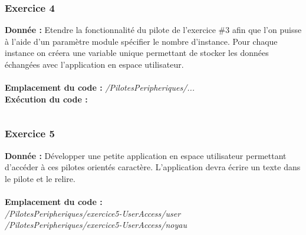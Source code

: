 \subsubsection{Exercice 4}
\textbf{Donnée : } Etendre	la	fonctionnalité	du	pilote	de	l’exercice	\#3 afin	que	l’on	puisse	à	l’aide	d’un	paramètre	
module	spécifier	le	nombre	d’instance.	Pour	chaque	instance	on	créera	une	variable	unique	
permettant	de	stocker	les	données	échangées	avec	l’application	en	espace	utilisateur.\\\\
\textbf{Emplacement du code : } \textit{/PilotesPeripheriques/...}\\

\textbf{Exécution du code : } \\
\begin{lstlisting}

\end{lstlisting}

\subsubsection{Exercice 5}
\textbf{Donnée : } Développer	une	petite	application	en	espace	utilisateur	permettant	d’accéder	à	ces	pilotes	
orientés	caractère.	L’application	devra	écrire	un	texte	dans	le	pilote	et	le	relire.\\\\
\textbf{Emplacement du code : }\\ \textit{/PilotesPeripheriques/exercice5-UserAccess/user}\\
\textit{/PilotesPeripheriques/exercice5-UserAccess/noyau}\\

